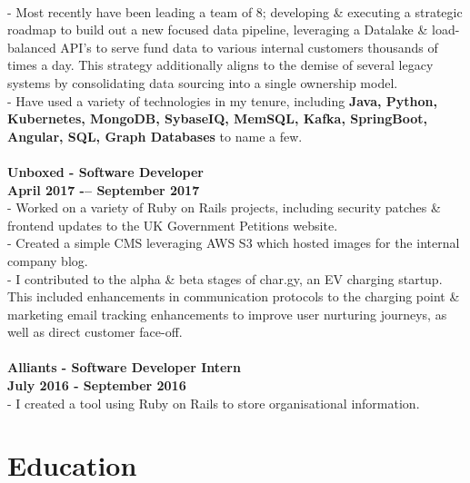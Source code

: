 \documentclass[a4paper,10pt]{article}
\begin{document}
		\\ - Most recently have been leading a team of 8; developing \& executing a strategic roadmap to build out a new focused data pipeline, leveraging a Datalake \& load-balanced API's to serve fund data to various internal customers thousands of times a day. This strategy additionally aligns to the demise of several legacy systems by consolidating data sourcing into a single ownership model.
		\\ - Have used a variety of technologies in my tenure, including \textbf{Java, Python, Kubernetes, MongoDB, SybaseIQ, MemSQL, Kafka, SpringBoot, Angular, SQL, Graph Databases} to name a few.
		\\\\	
	\textbf{Unboxed - Software Developer}
		\\\textbf{April 2017 -– September 2017} 
		\\ - Worked on a variety of Ruby on Rails projects, including security patches \& frontend updates to the UK Government Petitions website. 
		\\ - Created a simple CMS leveraging AWS S3 which hosted images for the internal company blog. 
		\\ - I contributed to the alpha \& beta stages of char.gy, an EV charging startup. This included enhancements in communication protocols to the charging point \& marketing email tracking enhancements to improve user nurturing journeys, as well as direct customer face-off.
		\\\\	
		\textbf{Alliants - Software Developer Intern}
		\\\textbf{July 2016 - September 2016}
		\\ - I created a tool using Ruby on Rails to store organisational information.
		\\
		

		
		

	
	\section*{Education}
	
\end{document}
